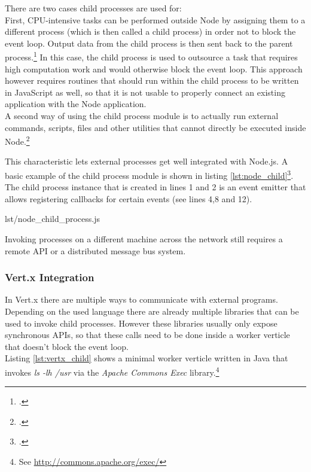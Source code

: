There are two cases child processes are used for:\\
First, CPU-intensive tasks can be performed outside Node by assigning them to a
different process (which is then called a child process) in order not to block
the event loop. Output data from the child process is then sent back to the
parent process.\footcite[Cf.][63]{teixeira_2012} In this case, the child process is used to
outsource a task that requires high computation work and would otherwise block
the event loop. This approach however requires routines that should run
within the child process to be written in JavaScript as well, so that it is not
usable to properly connect an existing application with the Node application.\\
A second way of using the child process module is to actually run external
commands, scripts, files and other utilities that cannot directly be executed inside Node.\footcite[Cf.][63]{teixeira_2012}

This characteristic lets external processes get well integrated with Node.js.
A basic example of the child process module is shown in listing \ref{lst:node_child}\footcite[Taken from][]{node_child_process}.
The child process instance that is created in lines 1 and 2 is an event emitter that
allows registering callbacks for certain events (see lines 4,8 and 12).

%
{lst/node_child_process.js}


Invoking processes on a different machine across the network still
requires a remote API or a distributed message bus system.


\subsubsection{Vert.x Integration}
\label{vertx_integration}
In Vert.x there are multiple ways to communicate with external programs.
Depending on the used language there are already multiple libraries that can be
used to invoke child processes. However these libraries usually only expose
synchronous APIs, so that these calls need to be done inside a worker verticle
that doesn't block the event loop.\\

Listing \ref{lst:vertx_child} shows a minimal worker verticle written in
Java that invokes \textit{ls -lh /usr} via the \textit{Apache Commons Exec}
library.\footnote{See \url{http://commons.apache.org/exec/}}

